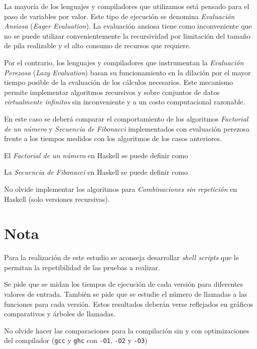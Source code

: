 \documentclass[a4paper,11pt]{article}
\begin{document}
La mayoría de los lenguajes y compiladores que utilizamos está pensado para
el paso de variables por valor.  Este tipo de ejecución se denomina
\emph{Evaluación Ansiosa} (\emph{Eager Evaluation}).  La evaluación ansiosa
tiene como inconveniente que no se puede utilizar convenientemente la
recursividad por limitación del tamaño de pila realizable y el alto consumo
de recursos que requiere.

Por el contrario, los lenguajes y compiladores que instrumentan la
\emph{Evaluación Perezosa} (\emph{Lazy Evaluation}) basan su funcionamiento
en la dilación por el mayor tiempo posible de la evaluación de los cálculos
necesarios.  Este mecanismo permite implementar algoritmos recursivos y sobre
conjuntos de datos \emph{virtualmente infinitos} sin inconveniente y a un costo computacional razonable.

En este caso se deberá comparar el comportamiento de los algoritmos
\emph{Factorial de un número} y \emph{Secuencia de Fibonacci} implementados
con evaluación perezosa frente a los tiempos medidos con los algoritmos de
los casos anteriores.

El \emph{Factorial de un número} en Haskell se puede definir como


La \emph{Secuencia de Fibonacci} en Haskell se puede definir como


No olvide implementar los algoritmos para \emph{Combinaciones sin repetición}
en Haskell (solo versiones recursivas).

\section*{Nota}

Para la realización de este estudio se aconseja desarrollar \emph{shell scripts}
que le permitan la repetibilidad de las pruebas a realizar.

Se pide que se midan los tiempos de ejecución de cada versión para
diferentes valores de entrada. También se pide que se estudie el número
de llamadas a las funciones para cada versión. Estos resultados deberán
verse reflejados en gráficos comparativos y árboles de llamadas.

No olvide hacer las comparaciones para la compilación sin y con optimizaciones
del compilador (\verb|gcc| y \verb|ghc| con \verb|-O1|, \verb|-O2| y
\verb|-O3|) 
\end{document}
